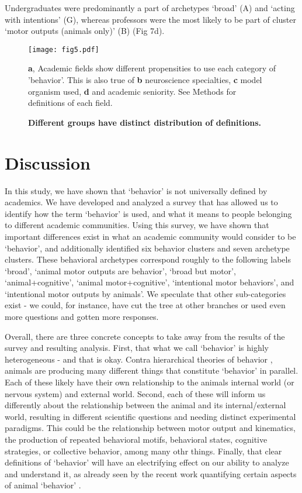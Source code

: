 \documentclass[a4paper, 11pt]{article}
\begin{document}
Undergraduates were predominantly a part of archetypes `broad' (A) and `acting with intentions' (G), whereas professors were the most likely to be part of cluster `motor outputs (animals only)' (B) (Fig 7d).

\begin{figure}
\centerline{\texttt{[image: fig5.pdf]}}
\caption{\textbf{Different groups have distinct distribution of definitions.}} \textbf{a}, Academic fields show different propensities to use each category of 'behavior'. This is also true of \textbf{b} neuroscience specialties, \textbf{c} model organism used, \textbf{d} and academic seniority. See Methods for definitions of each field.
\end{figure}

\section*{Discussion}

In this study, we have shown that `behavior' is not universally defined by academics. We have developed and analyzed a survey that has allowed us to identify how the term `behavior' is used, and what it means to people belonging to different academic communities. Using this survey, we have shown that important differences exist in what an academic community would consider to be `behavior', and additionally identified six behavior clusters and seven archetype clusters. These behavioral archetypes correspond roughly to the following labels `broad', `animal motor outputs are behavior', `broad but motor', `animal+cognitive', `animal motor+cognitive', `intentional motor behaviors', and `intentional motor outputs by animals'. We speculate that other sub-categories exist - we could, for instance, have cut the tree at other branches or used even more questions and gotten more responses.

Overall, there are three concrete concepts to take away from the results of the survey and resulting analysis. First, that what we call `behavior' is highly heterogeneous - and that is okay. Contra hierarchical theories of behavior \cite{rosenblueth1943behavior}, animals are producing many different things that constitute `behavior' in parallel. Each of these likely have their own relationship to the animals internal world (or nervous system) and external world. Second, each of these will inform us differently about the relationship between the animal and its internal/external world, resulting in different scientific questions and needing distinct experimental paradigms. This could be the relationship between motor output and kinematics, the production of repeated behavioral motifs, behavioral states, cognitive strategies, or collective behavior, among many othr things. Finally, that clear definitions of `behavior' will have an electrifying effect on our ability to analyze and understand it, as already seen by the recent work quantifying certain aspects of animal `behavior' \cite{berman2014mapping,wiltschko2015mapping,mathis2018deeplabcut,pereira2018leap}.
\end{document}
